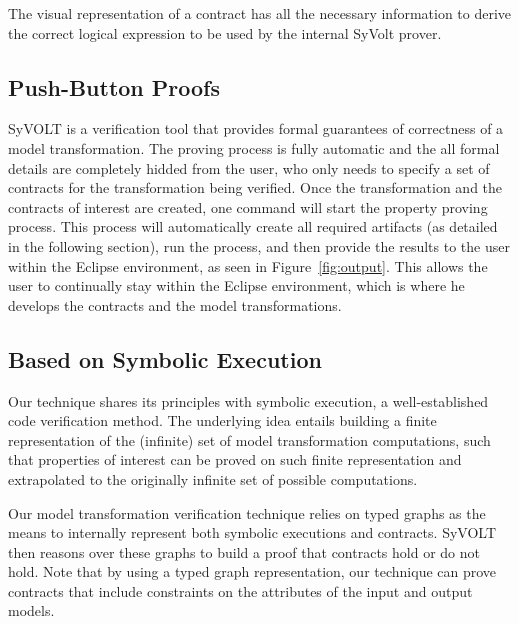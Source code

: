 The visual representation of a contract has all the necessary information to
derive the correct logical expression to be used by the internal SyVolt prover.

\subsection{Push-Button Proofs}
\label{sec:push_button_proofs}

SyVOLT is a verification tool that provides formal guarantees of correctness of
a model transformation. The
proving process is fully automatic and the all formal details are completely
hidded from the user, who only needs to specify a set of contracts for the
transformation being verified. Once the transformation and the contracts of
interest are created, one command will start the property proving process. This
process will automatically create all required artifacts (as detailed in the
following section), run the process, and then provide the results to the user
within the Eclipse environment, as seen in Figure~\ref{fig:output}. This allows
the user to continually stay within the Eclipse environment, which is where he
develops the contracts and the model transformations.


\subsection{Based on Symbolic Execution}

Our technique shares its principles with
symbolic execution, a well-established code verification method.
The underlying idea entails building a finite representation of the (infinite)
set of model transformation computations, such that properties of interest can
be proved on
such finite representation and extrapolated to the originally infinite set of possible
computations.

Our model transformation verification technique relies on typed graphs as the
means to internally represent both symbolic executions and contracts. SyVOLT
then reasons over these graphs to build a proof that contracts hold or do not
hold. Note that by using a typed graph representation, our technique can prove
contracts that include constraints on the attributes of the input and output
models. 

